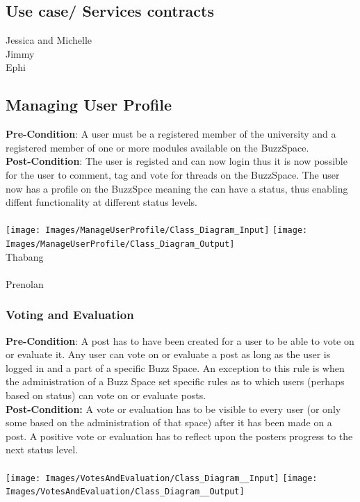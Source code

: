 \documentclass[a4paper,11pt]{article}
\begin{document}
\subsection{Use case/ Services contracts}
Jessica and Michelle\\
Jimmy\\
Ephi\\
\subsection{Managing User Profile}
\textbf{Pre-Condition}: A user must be a registered member of the university and a registered member of one or more modules available on the BuzzSpace.
\\
\textbf{Post-Condition}: The user is registed and can now login thus it is now possible for the user to comment, tag and vote for threads on the BuzzSpace. The user now has a profile on the BuzzSpce meaning the can have a status, thus enabling diffent functionality at different status levels.
\\
\\
\texttt{[image: Images/ManageUserProfile/Class\_Diagram\_Input]}
\texttt{[image: Images/ManageUserProfile/Class\_Diagram\_Output]}
\\
Thabang\\
\\
Prenolan
\subsubsection{Voting and Evaluation}
\textbf{Pre-Condition}: A post has to have been created for a user to be able to vote on or evaluate it. Any user can vote on or evaluate a post as long as the user is logged in and a part of a specific Buzz Space. An exception to this rule is when the administration of a Buzz Space set specific rules as to which users (perhaps based on status) can vote on or evaluate posts.
\\
\textbf{Post-Condition:} A vote or evaluation has to be visible to every user (or only some based on the administration of that space) after it has been made on a post. A positive vote or evaluation has to reflect upon the posters progress to the next status level.
\\
\\
\texttt{[image: Images/VotesAndEvaluation/Class\_Diagram\_\_Input]}
\texttt{[image: Images/VotesAndEvaluation/Class\_Diagram\_\_Output]}
\\
\end{document}

